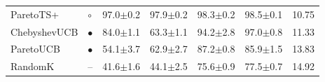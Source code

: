 \begin{tabular}{llrrrrr}
ParetoTS+ & $\circ$ & 97.0{\scriptsize$\pm$0.2} & 97.9{\scriptsize$\pm$0.2} & 98.3{\scriptsize$\pm$0.2} & 98.5{\scriptsize$\pm$0.1} & 10.75\\
ChebyshevUCB & $\bullet$ & 84.0{\scriptsize$\pm$1.1} & 63.3{\scriptsize$\pm$1.1} & 94.2{\scriptsize$\pm$2.8} & 97.0{\scriptsize$\pm$0.8} & 11.33\\
ParetoUCB & $\bullet$ & 54.1{\scriptsize$\pm$3.7} & 62.9{\scriptsize$\pm$2.7} & 87.2{\scriptsize$\pm$0.8} & 85.9{\scriptsize$\pm$1.5} & 13.83\\
RandomK & -- & 41.6{\scriptsize$\pm$1.6} & 44.1{\scriptsize$\pm$2.5} & 75.6{\scriptsize$\pm$0.9} & 77.5{\scriptsize$\pm$0.7} & 14.92\\
\bottomrule
\end{tabular}
